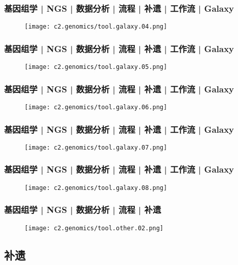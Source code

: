 \begin{frame}
  \frametitle{基因组学 | NGS | 数据分析 | 流程 | 补遗 | 工作流 | Galaxy}
  \begin{figure}
    \centering
    \texttt{[image: c2.genomics/tool.galaxy.04.png]}
  \end{figure}
\end{frame}

\begin{frame}
  \frametitle{基因组学 | NGS | 数据分析 | 流程 | 补遗 | 工作流 | Galaxy}
  \begin{figure}
    \centering
    \texttt{[image: c2.genomics/tool.galaxy.05.png]}
  \end{figure}
\end{frame}

\begin{frame}
  \frametitle{基因组学 | NGS | 数据分析 | 流程 | 补遗 | 工作流 | Galaxy}
  \begin{figure}
    \centering
    \texttt{[image: c2.genomics/tool.galaxy.06.png]}
  \end{figure}
\end{frame}

\begin{frame}
  \frametitle{基因组学 | NGS | 数据分析 | 流程 | 补遗 | 工作流 | Galaxy}
  \begin{figure}
    \centering
    \texttt{[image: c2.genomics/tool.galaxy.07.png]}
  \end{figure}
\end{frame}

\begin{frame}
  \frametitle{基因组学 | NGS | 数据分析 | 流程 | 补遗 | 工作流 | Galaxy}
  \begin{figure}
    \centering
    \texttt{[image: c2.genomics/tool.galaxy.08.png]}
  \end{figure}
\end{frame}

\begin{frame}
  \frametitle{基因组学 | NGS | 数据分析 | 流程 | 补遗}
  \begin{figure}
    \centering
    \texttt{[image: c2.genomics/tool.other.02.png]}
  \end{figure}
\end{frame}

\subsection{补遗}
